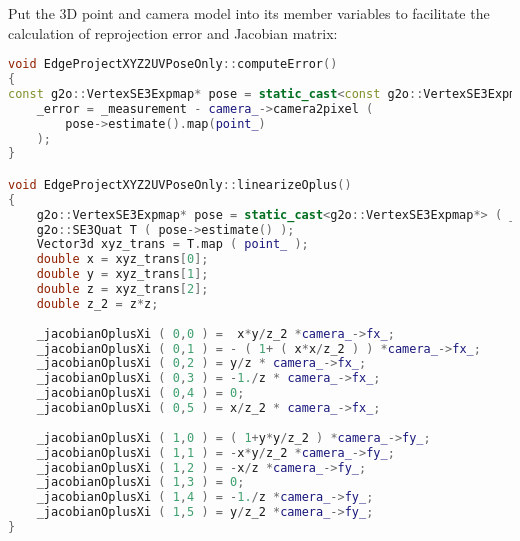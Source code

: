 Put the 3D point and camera model into its member variables to facilitate the calculation of reprojection error and Jacobian matrix:

\begin{lstlisting}[language=c++,caption=slambook/project/0.3/src/g2o\_types.cpp]
void EdgeProjectXYZ2UVPoseOnly::computeError()
{
const g2o::VertexSE3Expmap* pose = static_cast<const g2o::VertexSE3Expmap*> ( _vertices[0] );
	_error = _measurement - camera_->camera2pixel ( 
		pose->estimate().map(point_) 
	);
}

void EdgeProjectXYZ2UVPoseOnly::linearizeOplus()
{
	g2o::VertexSE3Expmap* pose = static_cast<g2o::VertexSE3Expmap*> ( _vertices[0] );
	g2o::SE3Quat T ( pose->estimate() );
	Vector3d xyz_trans = T.map ( point_ );
	double x = xyz_trans[0];
	double y = xyz_trans[1];
	double z = xyz_trans[2];
	double z_2 = z*z;
	
	_jacobianOplusXi ( 0,0 ) =  x*y/z_2 *camera_->fx_;
	_jacobianOplusXi ( 0,1 ) = - ( 1+ ( x*x/z_2 ) ) *camera_->fx_;
	_jacobianOplusXi ( 0,2 ) = y/z * camera_->fx_;
	_jacobianOplusXi ( 0,3 ) = -1./z * camera_->fx_;
	_jacobianOplusXi ( 0,4 ) = 0;
	_jacobianOplusXi ( 0,5 ) = x/z_2 * camera_->fx_;
	
	_jacobianOplusXi ( 1,0 ) = ( 1+y*y/z_2 ) *camera_->fy_;
	_jacobianOplusXi ( 1,1 ) = -x*y/z_2 *camera_->fy_;
	_jacobianOplusXi ( 1,2 ) = -x/z *camera_->fy_;
	_jacobianOplusXi ( 1,3 ) = 0;
	_jacobianOplusXi ( 1,4 ) = -1./z *camera_->fy_;
	_jacobianOplusXi ( 1,5 ) = y/z_2 *camera_->fy_;
}
\end{lstlisting}

